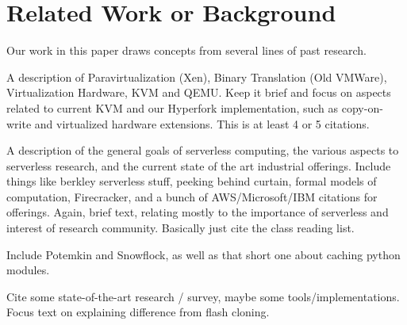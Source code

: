 \section{Related Work or Background} \label{sec:related}
Our work in this paper draws concepts from several lines of past research.

 A description of Paravirtualization
(Xen), Binary Translation (Old VMWare), Virtualization Hardware, KVM and QEMU. Keep
it brief and focus on aspects related to current KVM and our Hyperfork
implementation, such as copy-on-write and virtualized hardware extensions. This
is at least 4 or 5 citations.

 A description of the general goals of
serverless computing, the various aspects to serverless research, and the
current state of the art industrial offerings. Include things like berkley
serverless stuff, peeking behind curtain, formal models of computation,
Firecracker, and a bunch of AWS/Microsoft/IBM citations for offerings. Again,
brief text, relating mostly to the importance of serverless and interest of
research community. Basically just cite the class reading list.

Include Potemkin and Snowflock, as well as that short one about caching python
modules.

Cite some state-of-the-art research / survey, maybe some tools/implementations.
Focus text on explaining difference from flash cloning.
